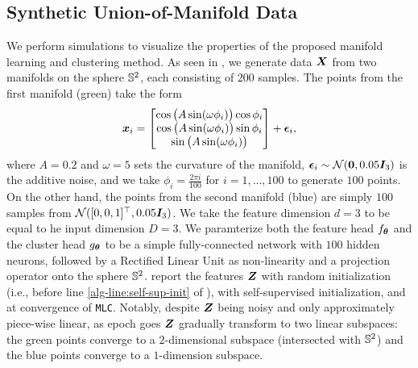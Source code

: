 \documentclass[10pt,twocolumn,letterpaper]{article}
\newcommand{\ours}{MLC}
\newcommand{\mours}{\texttt{\ours}}
\begin{document}
   \subsection{Synthetic Union-of-Manifold Data} \label{sec:simulations}
   We perform simulations
   to visualize the properties of the proposed manifold learning and clustering method. As seen in , we generate data ${\bm{X}}$ from two manifolds on the sphere ${\mathbb{S}}^2$, each consisting of $200$ samples. The points from the first manifold (green) take the form 
   {\small
   \begin{align}
       {\bm{x}}_i=\begin{bmatrix}
           \cos\big(A\sin(\omega\phi_i)\big)\cos\phi_i \\
           \cos\big(A\sin(\omega\phi_i)\big)\sin\phi_i \\
           \sin\big(A\sin(\omega\phi_i)\big)
       \end{bmatrix}
       + \boldsymbol{\epsilon}_i, 
   \end{align}
   }
   where $A=0.2$ and $\omega=5$ sets the curvature of the manifold, $\boldsymbol{\epsilon}_i\sim {\mathcal{N}}({\bm{0}},0.05{\bm{I}}_3)$ is the additive noise, and we take $\phi_i=\frac{2\pi i}{100}$ for $i=1,\dots,100$ to generate $100$ points. On the other hand, the points from the second manifold (blue) are simply $100$ samples from ${\mathcal{N}}([0,0,1]^\top,0.05{\bm{I}}_3)$. We take the feature dimension $d=3$ to be equal to he input dimension $D=3$. We paramterize both the feature head $f_{\boldsymbol{\theta}}$ and the cluster head $g_{\boldsymbol{\theta}}$ 
   to be a simple fully-connected network with $100$ hidden neurons, followed by a Rectified Linear Unit as non-linearity and a projection operator onto the sphere ${\mathbb{S}}^{2}$.  report the features ${\bm{Z}}$ with random initialization (i.e., before line \ref{alg-line:self-sup-init} of ), with self-supervised initialization, and at convergence of \mours{}.
   Notably, despite ${\bm{Z}}$ being noisy and only approximately piece-wise linear, as epoch goes ${\bm{Z}}$ gradually transform to two linear subspaces: the green points converge to a $2$-dimensional subspace (intersected with ${\mathbb{S}}^2$) and the blue points converge to a $1$-dimension subspace.
   
\end{document}
